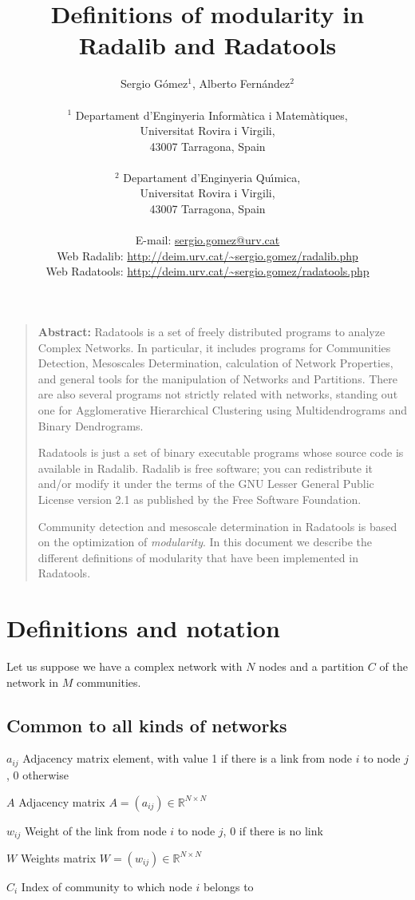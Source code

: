 \documentclass[11pt]{article}
\title{\bf \Large Definitions of modularity in {\sc Radalib} and {\sc Radatools}}
\author{Sergio G{\'o}mez$^1$, Alberto Fern{\'a}ndez$^2$\\
\\
\normalsize{$^1$ Departament d'Enginyeria Inform\`{a}tica i Matem\`{a}tiques,}\\
\normalsize{Universitat Rovira i Virgili,}\\
\normalsize{43007 Tarragona, Spain}\\
\\
\normalsize{$^2$ Departament d'Enginyeria Qu\'{\i}mica,}\\
\normalsize{Universitat Rovira i Virgili,}\\
\normalsize{43007 Tarragona, Spain}\\
\\
\normalsize{E-mail: \url{sergio.gomez@urv.cat}}\\
\normalsize{Web {\sc Radalib}: \url{http://deim.urv.cat/\~sergio.gomez/radalib.php}}\\
\normalsize{Web {\sc Radatools}: \url{http://deim.urv.cat/\~sergio.gomez/radatools.php}}\\
}
\date{}
\newcommand{\bdesc}[2]{\begin{basedescript}{\desclabelstyle{\pushlabel}\desclabelwidth{#1}\setlength{\labelsep}{0mm}\setlength{\leftmargin}{#2}}}
\newcommand{\edesc}{\end{basedescript}}
\begin{document}
\maketitle



\begin{quote}
{\bf Abstract:} {\sc Radatools} is a set of freely distributed programs to analyze Complex Networks. In particular, it includes programs for Communities Detection, Mesoscales Determination, calculation of Network Properties, and general tools for the manipulation of Networks and Partitions. There are also several programs not strictly related with networks, standing out one for Agglomerative Hierarchical Clustering using Multidendrograms and Binary Dendrograms.

{\sc Radatools} is just a set of binary executable programs whose source code is available in {\sc Radalib}. {\sc Radalib} is free software; you can redistribute it and/or modify it under the terms of the GNU Lesser General Public License version 2.1 as published by the Free Software Foundation.

Community detection and mesoscale determination in {\sc Radatools} is based on the optimization of {\em modularity}. In this document we describe the different definitions of modularity that have been implemented in {\sc Radatools}.
\end{quote}

\newpage


\section{Definitions and notation}

Let us suppose we have a complex network with $N$ nodes and a partition $C$ of the
network in $M$ communities.


\subsection{Common to all kinds of networks}

\bdesc{12mm}{12mm}
\item[$a_{ij}$] Adjacency matrix element, with value 1 if there is a link from node $i$ to node $j$, 0 otherwise
\item[$A$] Adjacency matrix $A = (a_{ij}) \in \mathbb{R}^{N\times N}$
\item[$w_{ij}$] Weight of the link from node $i$ to node $j$, 0 if there is no link
\item[$W$] Weights matrix $W = (w_{ij}) \in \mathbb{R}^{N\times N}$
\item[$C_i$] Index of community to which node $i$ belongs to
\edesc
\end{document}
